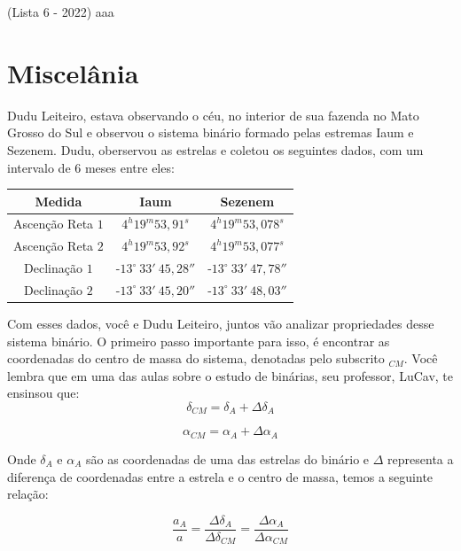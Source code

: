 \documentclass[11pt]{article}
\begin{document}
\begin{pproblem}(Lista 6 - 2022)
aaa
\end{pproblem}

\newpage

\section{Miscelânia}
\begin{pproblem} 
    Dudu Leiteiro, estava observando o céu, no interior de sua fazenda no Mato Grosso do Sul e observou o sistema binário formado pelas estremas Iaum e Sezenem. Dudu, oberservou as estrelas e coletou os seguintes dados, com um intervalo de 6 meses entre eles:
    \\
    \begin{center}
        \begin{tabular}{|c|c|c|}
            \hline %
            Medida & Iaum & Sezenem   \\ 
            \hline
            Ascenção Reta \(1\) & \(4^h19^m53,91^s\) & \(4^h19^m53,078^s\) \\
            Ascenção Reta \(2\) & \(4^h19^m53,92^s\) & \(4^h19^m53,077^s\) \\
            Declinação \(1\) & -\(13^\circ \ 33' \ 45,28''\) & -\(13^\circ \ 33' \ 47,78''\) \\
            Declinação \(2\) & -\(13^\circ \ 33' \ 45,20''\) & -\(13^\circ \ 33' \ 48,03''\) \\
            \hline
        \end{tabular} 
\end{center}
    Com esses dados, você e Dudu Leiteiro, juntos vão analizar propriedades desse sistema binário. O primeiro passo importante para isso, é encontrar as coordenadas do centro de massa do sistema, denotadas pelo subscrito \(_{CM}\). Você lembra que em uma das aulas sobre o estudo de binárias, seu professor, LuCav, te ensinsou que:
    \[
    \delta_{CM} = \delta_A + \Delta\delta_A
    \]

    \[
    \alpha_{CM} = \alpha_A + \Delta\alpha_A
    \]

    Onde \(\delta_A\) e \(\alpha_A\) são as coordenadas de uma das estrelas do binário e \(\Delta\) representa a diferença de coordenadas entre a estrela e o centro de massa, temos a seguinte relação:

    \[
    \frac{a_A}{a} = \frac{\Delta\delta_A}{\Delta\delta_{CM}} = \frac{\Delta\alpha_A}{\Delta\alpha_{CM}}
    \]


\end{pproblem}
\end{document}
